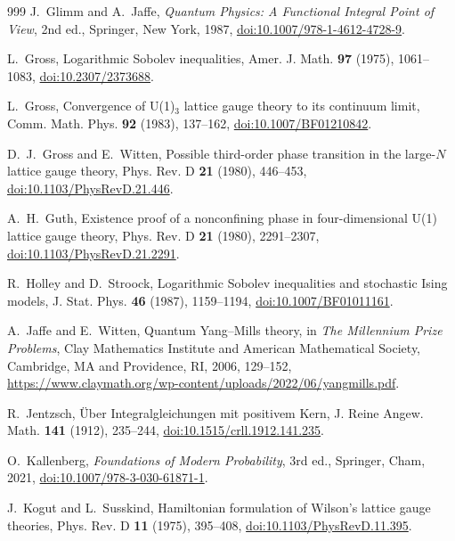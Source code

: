 \documentclass[aps,prd,twocolumn,superscriptaddress,nofootinbib,longbibliography,floatfix,amsmath,amssymb,10pt]{revtex4-2}
\theoremstyle{definition}
\theoremstyle{remark}
\begin{document}
\begin{thebibliography}{999}
J.~Glimm and A.~Jaffe, \emph{Quantum Physics: A Functional Integral Point of
View}, 2nd ed., Springer, New York, 1987,
\href{https://doi.org/10.1007/978-1-4612-4728-9}{doi:10.1007/978-1-4612-4728-9}.

L.~Gross, Logarithmic Sobolev inequalities, Amer. J. Math. \textbf{97}
(1975), 1061--1083, \href{https://doi.org/10.2307/2373688}{doi:10.2307/2373688}.

L.~Gross, Convergence of U(1)$_3$ lattice gauge theory to its continuum
limit, Comm. Math. Phys. \textbf{92} (1983), 137--162,
\href{https://doi.org/10.1007/BF01210842}{doi:10.1007/BF01210842}.

D.~J.~Gross and E.~Witten, Possible third-order phase transition in the
large-$N$ lattice gauge theory, Phys. Rev. D \textbf{21} (1980), 446--453,
\href{https://doi.org/10.1103/PhysRevD.21.446}{doi:10.1103/PhysRevD.21.446}.

A.~H.~Guth, Existence proof of a nonconfining phase in four-dimensional U(1)
lattice gauge theory, Phys. Rev. D \textbf{21} (1980), 2291--2307,
\href{https://doi.org/10.1103/PhysRevD.21.2291}{doi:10.1103/PhysRevD.21.2291}.

R.~Holley and D.~Stroock, Logarithmic Sobolev inequalities and stochastic
Ising models, J. Stat. Phys. \textbf{46} (1987), 1159--1194,
\href{https://doi.org/10.1007/BF01011161}{doi:10.1007/BF01011161}.

A.~Jaffe and E.~Witten, Quantum Yang--Mills theory, in \emph{The Millennium
Prize Problems}, Clay Mathematics Institute and American Mathematical
Society, Cambridge, MA and Providence, RI, 2006, 129--152,
\url{https://www.claymath.org/wp-content/uploads/2022/06/yangmills.pdf}.

R.~Jentzsch, \"Uber Integralgleichungen mit positivem Kern, J. Reine Angew.
Math. \textbf{141} (1912), 235--244,
\href{https://doi.org/10.1515/crll.1912.141.235}{doi:10.1515/crll.1912.141.235}.

O.~Kallenberg, \emph{Foundations of Modern Probability}, 3rd ed., Springer,
Cham, 2021, \href{https://doi.org/10.1007/978-3-030-61871-1}
{doi:10.1007/978-3-030-61871-1}.

J.~Kogut and L.~Susskind, Hamiltonian formulation of Wilson's lattice gauge
theories, Phys. Rev. D \textbf{11} (1975), 395--408,
\href{https://doi.org/10.1103/PhysRevD.11.395}{doi:10.1103/PhysRevD.11.395}.


\end{thebibliography}
\end{document}
